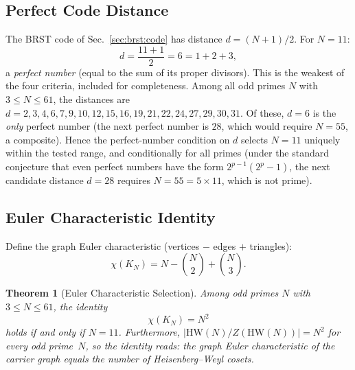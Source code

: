 \documentclass[aip,jmp,reprint,superscriptaddress,floatfix,nofootinbib]{revtex4-2}
\newtheorem{theorem}{Theorem}
\theoremstyle{definition}
\theoremstyle{remark}
\newcommand{\HW}{\mathrm{HW}}
\begin{document}
\subsection{Perfect Code Distance}
\label{sec:n11:perfect}

The BRST code of Sec.~\ref{sec:brst:code} has distance
$d = (N{+}1)/2$.  For $N = 11$:
\begin{equation}\label{eq:perfect-d}
d = \frac{11 + 1}{2} = 6 = 1 + 2 + 3,
\end{equation}
a \emph{perfect number} (equal to the sum of its proper divisors).
This is the weakest of the four criteria, included for completeness.
Among all odd primes $N$ with $3 \le N \le 61$, the distances are
$d = 2, 3, 4, 6, 7, 9, 10, 12, 15, 16, 19, 21, 22, 24, 27, 29, 30,
31$.  Of these, $d = 6$ is the \emph{only} perfect number (the next
perfect number is $28$, which would require $N = 55$, a
composite).  Hence the perfect-number condition on $d$ selects
$N = 11$ uniquely within the tested range, and conditionally for all
primes (under the standard conjecture that even perfect numbers have
the form $2^{p-1}(2^p - 1)$, the next candidate distance $d = 28$
requires $N = 55 = 5 \times 11$, which is not prime).

\subsection{Euler Characteristic Identity}
\label{sec:n11:euler}

Define the graph Euler characteristic (vertices $-$ edges $+$
triangles):
\begin{equation}\label{eq:graph-euler}
\chi(K_N) = N - \binom{N}{2} + \binom{N}{3}.
\end{equation}

\begin{theorem}[Euler Characteristic Selection]\label{thm:euler}
Among odd primes $N$ with $3 \le N \le 61$, the identity
\begin{equation}\label{eq:euler-char}
\chi(K_N) = N^2
\end{equation}
holds if and only if $N = 11$.  Furthermore, $|\HW(N)/Z(\HW(N))|
= N^2$ for every odd prime~$N$, so the identity reads:
the graph Euler characteristic of the carrier graph equals the
number of Heisenberg--Weyl cosets.
\end{theorem}
\end{document}
